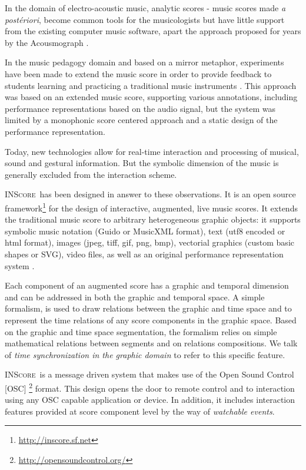 \documentclass[11pt,letterpaper]{article}
\newcommand{\inscore}		{\textsc{\small INScore}}
\begin{document}
In the domain of electro-acoustic music, analytic scores - music scores made \emph{a postériori}, become common tools for the musicologists but have little support from the existing computer music software, apart the approach proposed for years by the Acousmograph \cite{ACOUSM04}. 

In the music pedagogy domain and based on a mirror metaphor, experiments have been made to extend the music score in order to provide feedback to students learning and practicing a traditional music instruments \cite{Fober:07b}. This approach was based on an extended music score, supporting various annotations, including performance representations based on the audio signal, but the system was limited by a monophonic score centered approach and a static design of the performance representation.

Today, new technologies allow for real-time interaction and processing of musical, sound and gestural information. But the symbolic dimension of the music is generally excluded from the interaction scheme.

\inscore\ has been designed in answer to these observations. It is an open source framework\footnote{\url{http://inscore.sf.net}} for the design of interactive, augmented, live music scores. It extends the traditional music score to arbitrary heterogeneous graphic objects: it supports symbolic music notation (Guido \cite{hoos98} or MusicXML \cite{good01} format), text (utf8 encoded or html format), images (jpeg, tiff, gif, png, bmp), vectorial graphics (custom basic shapes or SVG), video files, as well as an original performance representation system \cite{Fober:10c}.

Each component of an augmented score has a graphic and temporal dimension and can be addressed in both the graphic and temporal space. A simple formalism, is used to draw relations between the graphic and time space and to represent the time relations of any score components in the graphic space. Based on the graphic and time space segmentation, the formalism relies on simple mathematical relations between segments and on relations compositions. We talk of \emph{time synchronization in the graphic domain} \cite{fober:10b} to refer to this specific feature.

\inscore\ is a message driven system that makes use of the Open Sound Control [OSC] \footnote{\url{http://opensoundcontrol.org/}} format. This design opens the door to remote control and to interaction using any OSC capable application or device. In addition, it includes interaction features provided at score component level by the way of \emph{watchable events}. 
\end{document}
